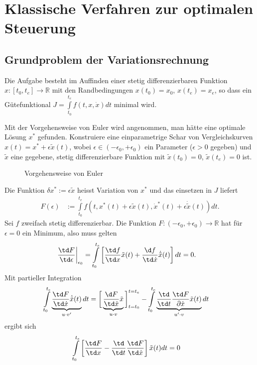 \chapter{Klassische Verfahren zur optimalen Steuerung}
\section{Grundproblem der Variationsrechnung}
\label{sec:kap_2_grundproblem}
Die Aufgabe besteht im Auffinden einer stetig differenzierbaren Funktion $x:[t_0,t_e]\rightarrow\mathbb{R}$ mit den Randbedingungen $x(t_0)=x_0$, $x(t_e)=x_e$, so dass ein
Gütefunktional $J=\int\limits_{t_0}^{t_e}f(t,x,\dot{x}) dt$ minimal wird.

Mit der Vorgehensweise von Euler wird angenommen, man hätte eine optimale Lösung $x^{\ast}$ gefunden. Konstruiere eine einparametrige Schar von Vergleichskurven
$x(t)=x^{\ast}+\epsilon\tilde{x}(t)$, wobei $\epsilon\in(-\epsilon_0,+\epsilon_0)$ ein Parameter ($\epsilon>0$ gegeben) und $\tilde{x}$ eine gegebene, stetig differenzierbare Funktion
mit $\tilde{x}(t_0)=0$, $\tilde{x}(t_e)=0$ ist.
\begin{figure}[htb]
	\centering
	
	\caption{Vorgehensweise von Euler}
	\label{fig:kap_2_vorg_euler}
\end{figure}
Die Funktion $\delta x^{\ast}:= \epsilon\tilde{x}$ heisst Variation von $x^{\ast}$ und das einsetzen in $J$ liefert 
\begin{align*}
	F(\epsilon) & := \int\limits_{t_0}^{t_e}f(t,x^{\ast}(t)+\epsilon\tilde{x}(t),\dot{x}^{\ast}(t)+\epsilon\dot{\tilde{x}}(t))dt.
\end{align*}
Sei $f$ zweifach stetig differenzierbar. Die Funktion $F:(-\epsilon_0,+\epsilon_0)\rightarrow\mathbb{R}$ hat für $\epsilon=0$ ein Minimum, also muss gelten
\begin{align*}
	\left.\frac{\td F}{\td \epsilon}\right|_{\epsilon_0} & = \int\limits_{t_0}^{t_e}\left[\frac{\td f}{\td x}\tilde{x}(t)+\frac{\d
	f}{\td\dot{x}}\dot{\tilde{x}}(t) \right]dt = 0.
\end{align*}
Mit partieller Integration 
\begin{align*}
	\int\limits_{t_0}^{t_e}\underbrace{\frac{\td F}{\td \dot{x}}\dot{\tilde{x}}(t)}_{u\cdot v'}dt & = \bigg[\underbrace{\frac{\d
	F}{\td\dot{x}}\tilde{x}}_{u\cdot v}\bigg]_{t=t_0}^{t=t_e}-\int\limits_{t_0}^{t_e} \underbrace{\frac{\td}{\td t}\frac{\td
	F}{\partial\dot{x}}\tilde{x}(t)}_{u'\cdot v}dt
\end{align*}
ergibt sich
\begin{align*}
	\int\limits_{t_0}^{t_e}\left[\frac{\td F}{\td x}-\frac{\td}{\td t}\frac{\td F}{\td\dot{x}} \right]\tilde{x}(t)dt & = 0
\end{align*}
